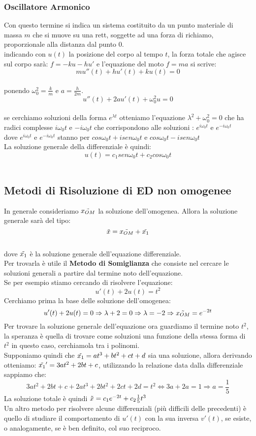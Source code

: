 \documentclass[a4paper,twoside]{article}
\theoremstyle{definition}
\numberwithin{theorem}{section}
\begin{document}
\subsubsection{Oscillatore Armonico}
Con questo termine si indica un sistema costituito da un punto materiale di massa $m$ che si muove su una rett, soggette ad una forza di richiamo, proporzionale alla distanza dal punto $0$. \\
indicando con $u(t)$ la posizione del corpo al tempo $t$, la forza totale che agisce sul corpo sarà: $f=-ku-hu'$ e l'equazione del moto $f=ma$ si scrive: $$mu''(t)+hu'(t)+ku(t)=0$$\\
ponendo $\omega_0^2=\frac{k}{m}$ e $a=\frac{h}{2m}$.\\
$$u''(t)+2au'(t)+\omega_0^2u=0$$ \\
se cerchiamo soluzioni della forma $e^{\lambda t}$ otteniamo l'equazione $\lambda^2 + \omega_0^2=0$ che ha radici complesse $i\omega_0t$ e $-i\omega_0t$ che corrispondono alle soluzioni : $e^{i\omega_0t}$ e $e^{-i\omega_0t}$\\
dove  $e^{i\omega_0t}$ e $e^{-i\omega_0t}$ stanno per $cos\omega_0t+isen\omega_0t$ e $cos\omega_0t-isen\omega_0t$ \\
La soluzione generale della differenziale è quindi: $$u(t)=c_1sen\omega_0t+c_2cos\omega_0t$$\\
\subsection{Metodi di Risoluzione di ED non omogenee}
In generale consideriamo $\Tilde{x_{OM}}$ la soluzione dell'omogenea. Allora la soluzione generale sarà del tipo: $$\Tilde{x}= \Tilde{x_{OM}}+ \Tilde{x_1}$$\\
dove $\Tilde{x_1}$ è la soluzione generale dell'equazione differenziale.\\
Per trovarla è utile il \textbf{Metodo di Somiglianza} che consiste nel cercare le soluzioni generali a partire dal termine noto dell'equazione.\\
Se per esempio stiamo cercando di risolvere l'equazione:
$$u'(t)+2u(t)=t^2$$
Cerchiamo prima la base delle soluzione dell'omogenea:$$u'(t)+2u(t)=0\Rightarrow \lambda +2 =0 \Rightarrow \lambda=-2 \Rightarrow \Tilde{x_{OM}}=e^{-2t}$$
Per trovare la soluzione generale dell'equazione ora guardiamo il termine noto $t^2$, la speranza è quella di trovare come soluzioni una funzione della stessa forma di $t^2$ in questo caso, cerchiamola tra i polinomi.\\
Supponiamo quindi che $\Tilde{x_1}=at^3+bt^2+ct+d$ sia una soluzione, allora derivando otteniamo: $\Tilde{x_1}'=3at^2+2bt+c$, utilizzando la relazione data dalla differenziale sappiamo che:
$$3at^2+2bt+c + 2at^3+2bt^2+2ct+2d=t^2\Leftrightarrow 3a+2a=1\Rightarrow a=\frac{1}{5}$$
La soluzione totale è quindi $\Tilde{x}= c_1e^{-2t}+c_2\frac{1}{5}t^3$\\
Un altro metodo per risolvere alcune differenziali (più difficili delle precedenti) è quello di studiare il comportamento di $u'(t)$ con la sua inversa $v'(t)$, se esiste, o analogamente, se è ben definito, col suo reciproco.
\end{document}
